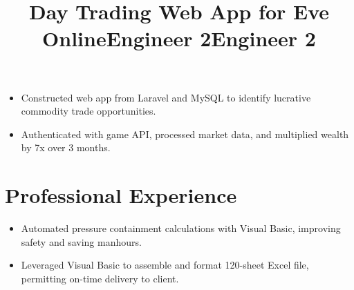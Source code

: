 \documentclass[12pt]{res} %
\begin{document}
\begin{resume}
        \employer{}
        \title{\textbf{Day Trading Web App for Eve Online}}
        \dates{}
        \begin{position}
          \vspace{-28pt}
          \begin{itemize}[leftmargin=-0.4cm, rightmargin=0.8cm]
          \itemsep0em
          \item Constructed web app from Laravel and MySQL to  identify lucrative commodity trade opportunities.
          \item Authenticated with game API, processed market data, and multiplied wealth by 7x over 3 months.
          \end{itemize}
        \end{position}
        \vspace{-10pt}

      \section{Professional Experience}
      \vspace{2pt}

        \title{\textbf{Engineer 2}}
        \begin{position}
          \vspace{-14pt}
          \begin{itemize}[leftmargin=-0.4cm, rightmargin=0.8cm]
          \itemsep0em
          \item Automated pressure containment calculations with Visual Basic, improving safety and saving manhours.
          \end{itemize}
        \end{position}
        \vspace{-10pt}

        \title{\textbf{Engineer 2}}
        \begin{position}
          \vspace{-14pt}
          \begin{itemize}[leftmargin=-0.4cm, rightmargin=0.8cm]
          \itemsep0em
              \item Leveraged Visual Basic to assemble and format 120-sheet Excel file, permitting on-time delivery to client.
          \end{itemize}
        \end{position}
        \vspace{-10pt}


\end{resume}
\end{document}

